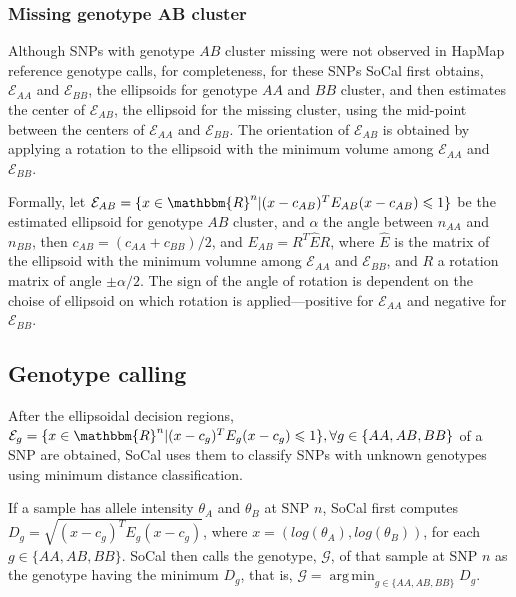\documentclass{scrartcl}
\begin{document}
\subsubsection{Missing genotype AB cluster}

Although SNPs with genotype $AB$ cluster missing were not observed in HapMap
reference genotype calls, for completeness, for these SNPs SoCal first
obtains, $\mathcal{E}_{AA}$ and $\mathcal{E}_{BB}$,
the ellipsoids for genotype $AA$ and $BB$ cluster, and then estimates the
center of $\mathcal{E}_{AB}$, the ellipsoid for the missing cluster, using
the mid-point between the centers of $\mathcal{E}_{AA}$ and $\mathcal{E}_{BB}$.
The orientation of $\mathcal{E}_{AB}$ is obtained by applying a rotation
to the ellipsoid with the minimum volume among $\mathcal{E}_{AA}$ and
$\mathcal{E}_{BB}$.

\par
Formally, let $\mathcal{E}_{AB}=
\{x \in \mathbbm{R}^{n}|(x-c_{AB})^TE_{AB}(x-c_{AB}) \leqslant 1\}$ be the
estimated ellipsoid for genotype $AB$ cluster, and $\alpha$ the angle between
$n_{AA}$ and $n_{BB}$, then
$c_{AB}=(c_{AA}+c_{BB})/2$, and
$E_{AB}=R^{T}\hat{E}R$, where $\hat{E}$ is the matrix of the ellipsoid
with the minimum volumne among $\mathcal{E}_{AA}$ and $\mathcal{E}_{BB}$, and
$R$ a rotation matrix of angle $\pm\alpha/2$.
The sign of the angle of rotation is dependent on the choise of ellipsoid on
which rotation is applied---positive for $\mathcal{E}_{AA}$ and negative
for $\mathcal{E}_{BB}$.

\subsection{Genotype calling}

\par
After the ellipsoidal decision regions,
$\mathcal{E}_{g}=
\{x \in \mathbbm{R}^{n} | (x-c_g)^TE_g(x-c_g) \leqslant 1\},
\forall g\in\{AA,AB,BB\}$ of a SNP are obtained, SoCal uses them to classify
SNPs with unknown genotypes using minimum distance classification.

\par
If a sample has allele intensity $\theta_A$ and $\theta_B$ at SNP $n$,
SoCal first computes
$D_g=\sqrt{(x-c_g)^TE_g(x-c_g)}$,
where $x=(log(\theta_A), log(\theta_B))$, for each $g\in\{AA,AB,BB\}$.
SoCal then calls the genotype, $\mathcal{G}$, of that sample at SNP $n$
as the genotype having the minimum $D_g$, that is,
$\mathcal{G}=\operatorname*{arg\,min}_{g\in \{AA,AB,BB\}}D_g$.
\end{document}

